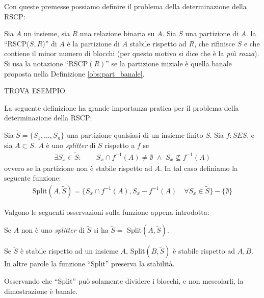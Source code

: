 Con queste premesse possiamo definire il problema della determinazione della RSCP:
\begin{definition}
    Sia $A$ un insieme, sia $R$ una relazione binaria su $A$. Sia $S$ una partizione di $A$. la ``RSCP($S,R$)'' di $A$ è la partizione di $A$ stabile rispetto ad $R$, che rifinisce $S$ e che contiene il minor numero di blocchi (per questo motivo si dice che è la \emph{più rozza}).\\
    Si usa la notazione ``RSCP$(R)$'' se la partizione iniziale è quella banale proposta nella Definizione \ref{obs:part_banale}.
\end{definition}
\begin{example}
    TROVA ESEMPIO
\end{example}
La seguente definizione ha grande importanza pratica per il problema della determinazione della RSCP:
\begin{definition}
    \label{def:funz_split}
    Sia $\widetilde{S} = \{S_1,\dots,S_n\}$ una partizione qualsiasi di un insieme finito $S$. Sia $f: S E S$, e sia $A \subset S$. $A$ è uno \emph{splitter} di $S$ rispetto a $f$ se
    \begin{gather*}
        \exists S_x \in \widetilde{S} : \qquad S_x \cap f^{-1}(A) \neq \emptyset \,\,\land\,\, S_x \not\subseteq f^{-1}(A)
    \end{gather*}
    ovvero se la partizione non è stabile rispetto ad $A$. In tal caso definiamo la seguente funzione:
    \begin{gather*}
        \text{Split}(A,\widetilde{S}) = \{S_x \cap f^{-1}(A), S_x - f^{-1}(A) \quad \forall S_x \in \widetilde{S}\} - \{\emptyset\}
    \end{gather*}
\end{definition}
Valgono le seguenti osservazioni sulla funzione appena introdotta:
\begin{observation}
    Se $A$ non è uno \emph{splitter} di $\widetilde{S}$ si ha $\widetilde{S} = $ Split$(A,\widetilde{S})$.
\end{observation}
\begin{observation}
    \label{obs:split_eredita}
    Se $\widetilde{S}$ è stabile rispetto ad un insieme $A$, Split$(B,\widetilde{S})$ è stabile rispetto ad $A,B$. In altre parole la funzione ``Split'' preserva la stabilità.
\end{observation}
\begin{proof2}
    Osservando che ``Split'' può solamente dividere i blocchi, e non mescolarli, la dimostrazione è banale.
\end{proof2}
